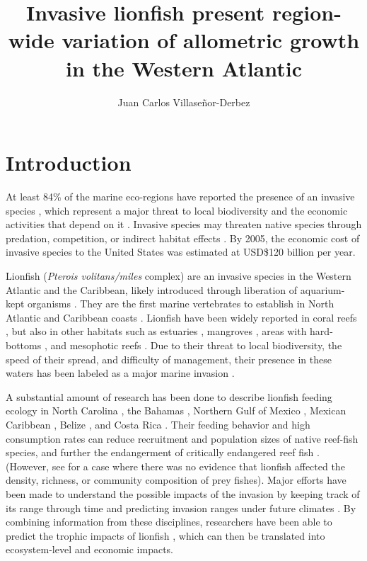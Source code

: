 \documentclass[fleqn,10pt,lineno]{wlpeerj} %
\title{Invasive lionfish present region-wide variation of allometric growth in
the Western Atlantic}
\author[1]{Juan Carlos Villaseñor-Derbez}
\affil[1]{Bren School of Environmental Sciences and Management, University of
California Santa Barbara, Santa Barbara, California, U.S.}
\theoremstyle{definition}
\theoremstyle{definition}
\theoremstyle{definition}
\theoremstyle{remark}
\begin{document}
\flushbottom
\maketitle
\thispagestyle{empty}

\section*{Introduction}

At least 84\% of the marine eco-regions have reported the presence of an
invasive species \citep{molnar_2008}, which represent a major threat to
local biodiversity and the economic activities that depend on it
\citep{bax_2003}. Invasive species may threaten native species through
predation, competition, or indirect habitat effects
\citep{davis_2003, gurevitch_2004}. By 2005, the economic cost of
invasive species to the United States was estimated at USD\$120 billion
per year\citep{pimentel_2005}.

Lionfish (\emph{Pterois volitans/miles} complex) are an invasive species
in the Western Atlantic and the Caribbean, likely introduced through
liberation of aquarium-kept organisms \citep{betancurr_2011}. They are
the first marine vertebrates to establish in North Atlantic
\citep{schofield_2009,schofield_2010} and Caribbean coasts
\citep{sabidoitza_2016}. Lionfish have been widely reported in coral
reefs \citep{aguilarperera_2010}, but also in other habitats such as
estuaries \citep{jud_2011}, mangroves \citep{barbour_2010}, areas with
hard-bottoms \citep{muoz_2011}, and mesophotic reefs
\citep{andradibrown_2017}. Due to their threat to local biodiversity,
the speed of their spread, and difficulty of management, their presence
in these waters has been labeled as a major marine invasion
\citep{hixon_2016}.

A substantial amount of research has been done to describe lionfish
feeding ecology in North Carolina \citep{muoz_2011}, the Bahamas
\citep{morris_2009,cote_2013}, Northern Gulf of Mexico
\citep{dahl_2014}, Mexican Caribbean
\citep{valdezmoreno_2012,villaseorderbez_2014}, Belize
\citep{hackerott_2017}, and Costa Rica \citep{sandel_2015}. Their
feeding behavior and high consumption rates can reduce recruitment
\citep{albins_2008} and population sizes \citep{green_2012} of native
reef-fish species, and further the endangerment of critically endangered
reef fish \citep{rocha_2015}. (However, see \citet{hackerott_2017} for a
case where there was no evidence that lionfish affected the density,
richness, or community composition of prey fishes). Major efforts have
been made to understand the possible impacts of the invasion by keeping
track of its range through time \citep{schofield_2009,schofield_2010}
and predicting invasion ranges under future climates
\citep{grieve_2016}. By combining information from these disciplines,
researchers have been able to predict the trophic impacts of lionfish
\citep{ariasgonzalez_2011}, which can then be translated into
ecosystem-level and economic impacts.
\end{document}
